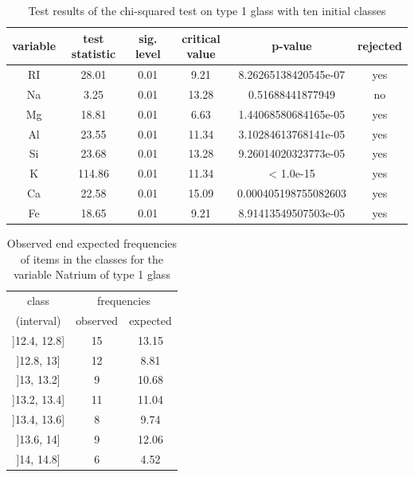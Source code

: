 \documentclass[a4paper, 12pt, titlepage, headsepline, listof = totoc, bibliography = totoc, numbers = noenddot]{scrartcl}
\begin{document}
\begin{table}[h!]
\centering
\begin{tabular}{|cccccc|} \hline variable & test statistic & sig. level & critical value & p-value & rejected\\ \hline RI & 28.01 & 0.01 & 9.21 & 8.26265138420545e-07 & yes\\ 
Na & 3.25 & 0.01 & 13.28 & 0.51688441877949 & no\\ 
Mg & 18.81 & 0.01 & 6.63 & 1.44068580684165e-05 & yes\\ 
Al & 23.55 & 0.01 & 11.34 & 3.10284613768141e-05 & yes\\ 
Si & 23.68 & 0.01 & 13.28 & 9.26014020323773e-05 & yes\\ 
K & 114.86 & 0.01 & 11.34 & < 1.0e-15 & yes\\ 
Ca & 22.58 & 0.01 & 15.09 & 0.000405198755082603 & yes\\ 
Fe & 18.65 & 0.01 & 9.21 & 8.91413549507503e-05 & yes\\ \hline \end{tabular}\caption{Test results of the chi-squared test on type 1 glass with ten initial classes}
\label{tab:chi-type1}
\end{table}

\begin{table}[h!]
\centering
\begin{tabular}{|c|cc|} \hline class & \multicolumn{2}{c|}{frequencies}\\ (interval) & observed & expected\\ \hline ]12.4, 12.8] & 15 & 13.15\\ 
]12.8, 13] & 12 & 8.81\\ 
]13, 13.2] & 9 & 10.68\\ 
]13.2, 13.4] & 11 & 11.04\\ 
]13.4, 13.6] & 8 & 9.74\\ 
]13.6, 14] & 9 & 12.06\\ 
]14, 14.8] & 6 & 4.52\\ \hline \end{tabular}\caption{Observed end expected frequencies of items in the classes for the variable Natrium of type 1 glass}
\label{tab:testresChisqFreqNaType1}
\end{table}
\end{document}
